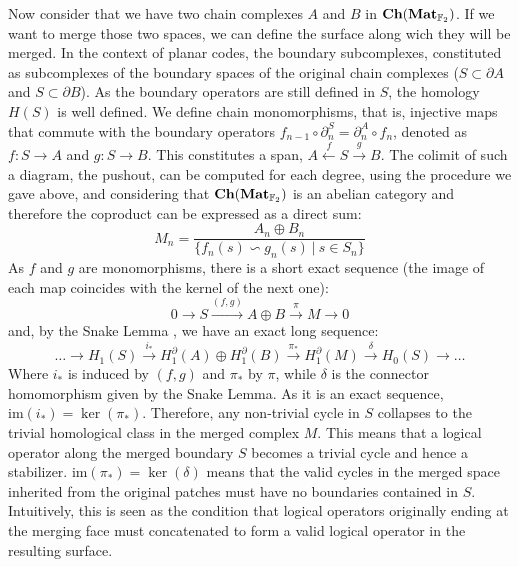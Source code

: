 \documentclass[12pt, twoside, openany]{book}
\newcommand{\catname}[1]{{\normalfont\textbf{#1}}}
\newcommand{\Ch}{\catname{Ch}}
\newcommand{\Mat}{\catname{Mat}}
\begin{document}
Now consider that we have two chain complexes $A$ and $B$ in $\Ch(\Mat_{\mathbb{F}_2})$. If we want to merge those two spaces, we can define the surface along wich they will be merged. In the context of planar codes, the boundary subcomplexes, constituted as subcomplexes of the boundary spaces of the original chain complexes ($S \subset \partial A$ and $S \subset \partial B$). As the boundary operators are still defined in $S$, the homology $H(S)$ is well defined. We define chain monomorphisms, that is, injective maps that commute with the boundary operators $f_{n-1} \circ \partial_n^S = \partial_n^{A} \circ f_n$, denoted as $f: S \rightarrow A$ and $g: S \rightarrow B$. This constitutes a span, $A \xleftarrow{f} S \xrightarrow{g} B$. The colimit of such a diagram, the pushout, can be computed for each degree, using the procedure we gave above, and considering that $\Ch(\Mat_{\mathbb{F}_2})$ is an abelian category and therefore the coproduct can be expressed as a direct sum:
\begin{equation}
    M_n = \frac{A_n \oplus B_n}{\{f_n(s) \backsim g_n(s) \ | \ s \in S_n\}}
\end{equation}
As $f$ and $g$ are monomorphisms, there is a short exact sequence (the image of each map coincides with the kernel of the next one):
\begin{equation} 
    0 \to S \xrightarrow{(f, g)} A \oplus B \xrightarrow{\pi} M \to 0 
\end{equation}
and, by the Snake Lemma \cite{cowtan2025fastfaulttolerantlogicalmeasurements}, we have an exact long sequence:
\begin{equation} 
    \dots \to H_1(S) \xrightarrow{i_*} H_1^\partial(A) \oplus H_1^\partial(B) \xrightarrow{\pi_*} H_1^\partial(M) \xrightarrow{\delta} H_0(S) \to \dots
\end{equation}
Where $i_*$ is induced by $(f,g)$ and $\pi_*$ by $\pi$, while $\delta$ is the connector homomorphism given by the Snake Lemma.  As it is an exact sequence, $\text{im}(i_*) = \ker (\pi_*)$. Therefore, any non-trivial cycle in $S$ collapses to the trivial homological class in the merged complex $M$. This means that a logical operator along the merged boundary $S$ becomes a trivial cycle and hence a stabilizer. $\text{im}(\pi_*) = \ker(\delta)$ means that the valid cycles in the merged space inherited from the original patches must have no boundaries contained in $S$. Intuitively, this is seen as the condition that logical operators originally ending at the merging face must concatenated to form a valid logical operator in the resulting surface.
\end{document}
